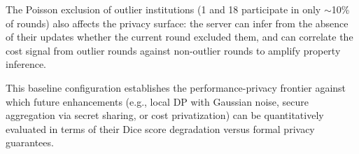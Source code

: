 \documentclass{article}
\begin{document}
The Poisson exclusion of outlier institutions (1 and 18 participate in only $\sim$10\% of rounds) also affects the privacy surface: the server can infer from the absence of their updates whether the current round excluded them, and can correlate the cost signal from outlier rounds against non-outlier rounds to amplify property inference.

This baseline configuration establishes the performance-privacy frontier against which future enhancements (e.g., local DP with Gaussian noise, secure aggregation via secret sharing, or cost privatization) can be quantitatively evaluated in terms of their Dice score degradation versus formal privacy guarantees.


\end{document}
